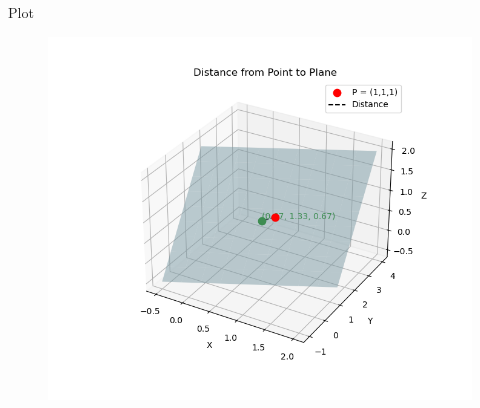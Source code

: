 \documentclass{beamer}
\begin{document}
\begin{frame}{Plot}
\begin{figure}[H]
    \centering
    \includegraphics[height=0.5\textheight, keepaspectratio]{figs/Figure_1.png}
    \label{figure_1}
\end{figure}
\end{frame}
\end{document}
